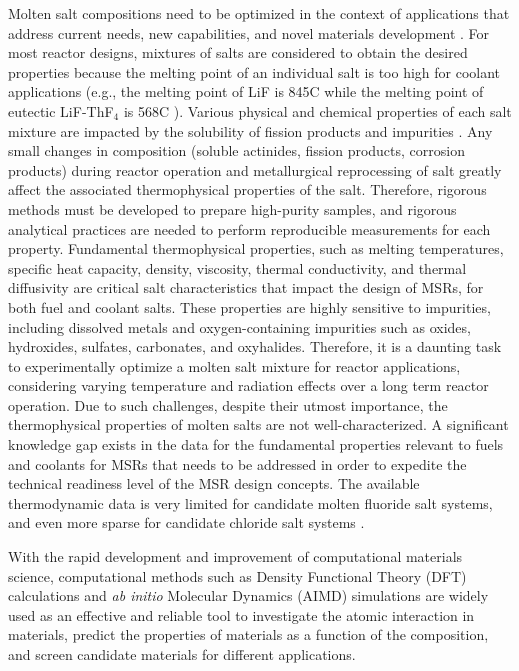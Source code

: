 \documentclass[review]{elsarticle}
\begin{document}
Molten salt compositions need to be optimized in the context of applications that address current needs, new capabilities, and novel materials development \cite{WU2018159}. For most reactor designs, mixtures of salts are considered to obtain the desired properties because the melting point of an individual salt is too high for coolant applications (e.g., the melting point of LiF is 845\degree C while the melting point of eutectic LiF-ThF$_{4}$ is 568\degree C \cite{CAPELLI2013110}). Various physical and chemical properties of each salt mixture are impacted by the solubility of fission products and impurities \cite{Song2017}. Any small changes in composition (soluble actinides, fission products, corrosion products) during reactor operation and metallurgical reprocessing of salt greatly affect the associated thermophysical properties of the salt. Therefore, rigorous methods must be developed to prepare high-purity samples, and rigorous analytical practices are needed to perform reproducible measurements for each property. Fundamental thermophysical properties, such as melting temperatures, specific heat capacity, density, viscosity, thermal conductivity, and thermal diffusivity are critical salt characteristics that impact the design of MSRs, for both fuel and coolant salts. These properties are highly sensitive to impurities, including dissolved metals and oxygen-containing impurities such as oxides, hydroxides, sulfates, carbonates, and oxyhalides. Therefore, it is a daunting task to experimentally optimize a molten salt mixture for reactor applications, considering varying temperature and radiation effects over a long term reactor operation. Due to such challenges, despite their utmost importance, the thermophysical properties of molten salts are not well-characterized. A significant knowledge gap exists in the data for the fundamental properties relevant to fuels and coolants for MSRs that needs to be addressed in order to expedite the technical readiness level of the MSR design concepts. The available thermodynamic data is very limited for candidate molten fluoride salt systems, and even more sparse for candidate chloride salt systems \cite{Janz1988,capelli2012,fredrickson2018molten,benevs2020molten,McMurray2021}.

With the rapid development and improvement of computational materials science, computational methods such as Density Functional Theory (DFT) calculations and \textit{ab initio} Molecular Dynamics (AIMD) simulations are widely used as an effective and reliable tool to investigate the atomic interaction in materials, predict the properties of materials as a function of the composition, and screen candidate materials for different applications. 
\end{document}
